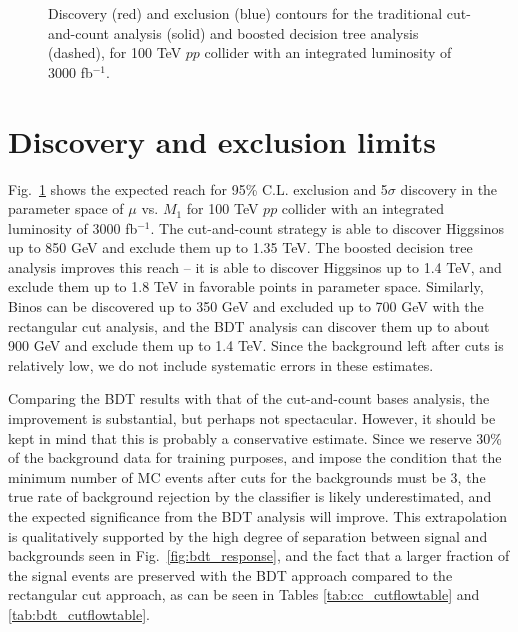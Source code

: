 \documentclass[a4paper,11pt]{article}
\begin{document}
\begin{figure}[h]
\centering


\caption{ Discovery (red) and exclusion (blue) contours for the traditional
  cut-and-count analysis (solid) and boosted decision tree analysis (dashed),
  for 100 TeV $pp$ collider with an integrated luminosity of 3000 fb$^{-1}$.
}

\label{fig:contours}
\end{figure}

\section{Discovery and exclusion limits}
\label{sec:results}

Fig.~\ref{fig:contours} shows the expected reach  for 95\% C.L. exclusion and
5$\sigma$ discovery in the parameter space of $\mu$ vs.  $M_1$ for 100 TeV $pp$
collider with an integrated luminosity of 3000 fb$^{-1}$. The cut-and-count
strategy is able to discover Higgsinos up to 850 GeV  and exclude them up to
1.35 TeV.  The boosted decision
tree analysis improves this reach -- it is able to discover Higgsinos up to
1.4 TeV, and exclude them up to 1.8 TeV in favorable points in parameter space.
Similarly, Binos can be discovered up to 350 GeV and excluded up to 700 GeV
with the rectangular cut analysis, and the BDT analysis can discover them up to
about 900 GeV and exclude them up to 1.4 TeV. Since the background left after
cuts is relatively low, we do not include systematic errors in these estimates.  


Comparing the BDT results with that of the cut-and-count bases analysis, the improvement is substantial, but perhaps not spectacular. However, it should
be kept in mind that this is probably a conservative estimate. Since we reserve
30\% of the background data for training purposes, and impose the condition that the
minimum number of MC events after cuts for the backgrounds must be 3, the true rate of background
rejection by the classifier is likely underestimated, and the expected
significance from the BDT analysis will improve. This extrapolation is
qualitatively supported by the high degree of separation between signal and
backgrounds seen in Fig.~\ref{fig:bdt_response}, and the fact that a larger
fraction of the signal events are preserved with the BDT approach compared to
the rectangular cut approach, as can be seen in Tables \ref{tab:cc_cutflowtable}
and \ref{tab:bdt_cutflowtable}.  
\end{document}
